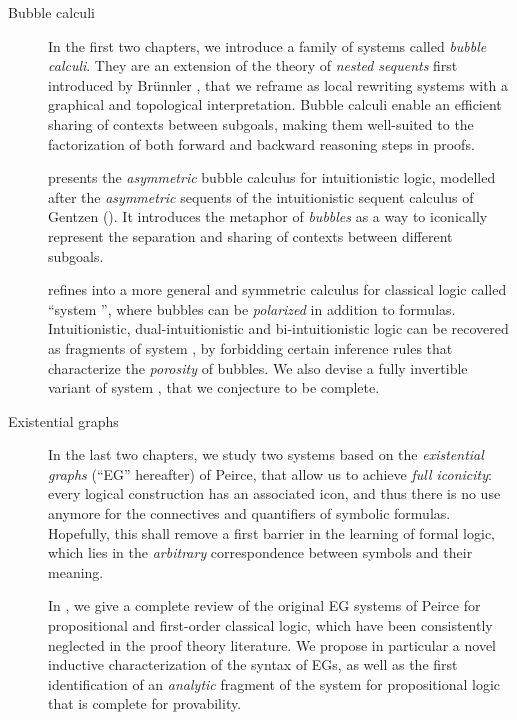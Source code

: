 \begin{description}
  \item[Bubble calculi] In the first two chapters, we introduce a family of
  systems called \emph{bubble calculi}. They are an extension of the theory of
  \emph{nested sequents} first introduced by Brünnler
  , that we reframe as local rewriting systems with
  a graphical and topological interpretation. Bubble calculi enable an efficient
  sharing of contexts between subgoals, making them well-suited to the
  factorization of both forward and backward reasoning steps in proofs.

   presents the \emph{asymmetric} bubble calculus  for
  intuitionistic logic, modelled after the \emph{asymmetric} sequents of the
  intuitionistic sequent calculus  of Gentzen (). It
  introduces the metaphor of \emph{bubbles} as a way to iconically represent the
  separation and sharing of contexts between different subgoals.

   refines  into a more general and symmetric
  calculus for classical logic called ``system '', where bubbles can be
  \emph{polarized} in addition to formulas. Intuitionistic, dual-intuitionistic
  and bi-intuitionistic logic can be recovered as fragments of system ,
  by forbidding certain inference rules that characterize the \emph{porosity} of
  bubbles. We also devise a fully invertible variant of system , that we
  conjecture to be complete.
  
  \item[Existential graphs] In the last two chapters, we study two systems based
  on the \emph{existential graphs} (``EG'' hereafter) of Peirce, that allow us to
  achieve \emph{full iconicity}: every logical construction has an associated
  icon, and thus there is no use anymore for the connectives and quantifiers of
  symbolic formulas. Hopefully, this shall remove a first barrier in the learning
  of formal logic, which lies in the \emph{arbitrary} correspondence between
  symbols and their meaning.

  In , we give a complete review of the original EG systems of Peirce
  for propositional and first-order classical logic, which have been
  consistently neglected in the proof theory literature. We propose in particular a novel inductive
  characterization of the syntax of EGs, as well as the first identification of
  an \emph{analytic} fragment of the system for propositional logic that is
  complete for provability.


\end{description}
